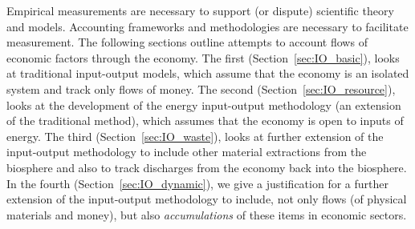 Empirical measurements are necessary to support
(or dispute) scientific theory and models.
Accounting frameworks and methodologies are necessary
to facilitate measurement.
The following sections outline attempts to
account flows of economic factors through the
economy. 
The first (Section~\ref{sec:IO_basic}),
looks at traditional input-output models, 
which assume that the economy is an isolated system 
and track only flows of money.
The second (Section~\ref{sec:IO_resource}),
looks at the development of the energy input-output methodology
(an extension of the traditional method),
which assumes that the economy is open to inputs of energy.
The third (Section~\ref{sec:IO_waste}),
looks at further extension of the input-output methodology
to include other material extractions from the biosphere and also
to track discharges from the economy back into the biosphere.
In the fourth (Section~\ref{sec:IO_dynamic}),
we give a justification for a further extension of the input-output
methodology to include,
not only flows (of physical materials and money),
but also \emph{accumulations} of these items
in economic sectors.
%
%
%
%
%
%



